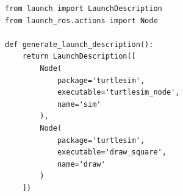 \documentclass[preview,border=2pt]{standalone}
\begin{document}
\begin{lstlisting}[style=pythonstyle]
from launch import LaunchDescription
from launch_ros.actions import Node

def generate_launch_description():
    return LaunchDescription([
        Node(
            package='turtlesim',
            executable='turtlesim_node',
            name='sim'
        ),
        Node(
            package='turtlesim',
            executable='draw_square',
            name='draw'
        )
    ])
\end{lstlisting}
\end{document}
